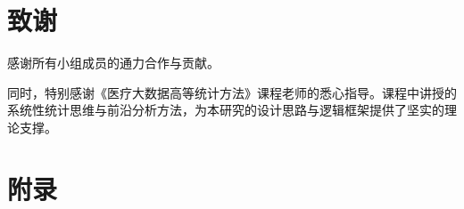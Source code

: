 \documentclass[lang=cn,a4paper,newtx,code=minted,codebg=light]{elegantpaper}
\begin{document}
\vspace{2em}

\section*{致谢}

\noindent 感谢所有小组成员的通力合作与贡献。

\vspace{1.0em}

\noindent 同时，特别感谢《医疗大数据高等统计方法》课程老师的悉心指导。课程中讲授的系统性统计思维与前沿分析方法，为本研究的设计思路与逻辑框架提供了坚实的理论支撑。

\vspace{2em}

\nocite{*}
\printbibliography[heading=bibintoc, title=\ebibname]

\appendix
\addappheadtotoc

\clearpage

\vspace*{1.5em}

\section*{附录}
\end{document}
